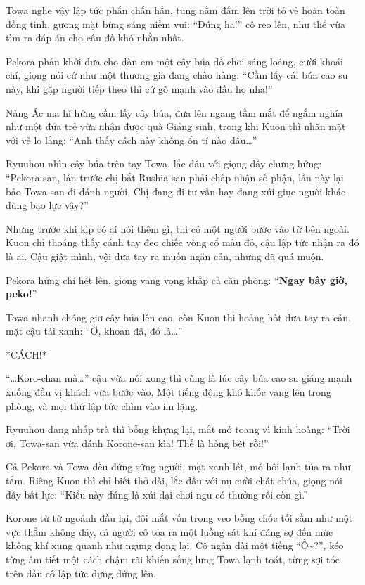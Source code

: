 \documentclass[../main.tex]{subfiles}
\begin{document}
Towa nghe vậy lập tức phấn chấn hẳn, tung nắm đấm lên trời tỏ vẻ hoàn toàn đồng tình, gương mặt bừng sáng niềm vui: ``Đúng ha!'' cô reo lên, như thể vừa tìm ra đáp án cho câu đố khó nhằn nhất.

Pekora phấn khởi đưa cho đàn em một cây búa đồ chơi sáng loáng, cười khoái chí, giọng nói cứ như một thương gia đang chào hàng: ``Cầm lấy cái búa cao su này, khi gặp người tiếp theo thì cứ gõ mạnh vào đầu họ nha!''


Nàng Ác ma hí hửng cầm lấy cây búa, đưa lên ngang tầm mắt để ngắm nghía như một đứa trẻ vừa nhận được quà Giáng sinh, trong khi Kuon thì nhăn mặt với vẻ lo lắng: ``Anh thấy cách này không ổn tí nào đâu\dots''

Ryuuhou nhìn cây búa trên tay Towa, lắc đầu với giọng đầy chưng hửng: ``Pekora-san, lần trước chị bắt Rushia-san phải chấp nhận số phận, lần này lại bảo Towa-san đi đánh người. Chị đang đi tư vấn hay đang xúi giục người khác dùng bạo lực vậy?''

Nhưng trước khi kịp có ai nói thêm gì, thì có một người bước vào từ bên ngoài. Kuon chỉ thoáng thấy cánh tay đeo chiếc vòng cổ màu đỏ, cậu lập tức nhận ra đó là ai. Cậu giật mình, vội đưa tay ra muốn ngăn cản, nhưng đã quá muộn.

Pekora hứng chí hét lên, giọng vang vọng khắp cả căn phòng: ``\textbf{Ngay bây giờ, peko!}''

Towa nhanh chóng giơ cây búa lên cao, còn Kuon thì hoảng hốt đưa tay ra cản, mặt cậu tái xanh: ``Ơ, khoan đã, đó là\dots''

*CÁCH!*

``\dots Koro-chan mà\dots'' cậu vừa nói xong thì cũng là lúc cây búa cao su giáng mạnh xuống đầu vị khách vừa bước vào. Một tiếng động khô khốc vang lên trong phòng, và mọi thứ lập tức chìm vào im lặng.


Ryuuhou đang nhấp trà thì bỗng khựng lại, mắt mở toang vì kinh hoàng: ``Trời ơi, Towa-san vừa đánh Korone-san kìa! Thế là hỏng bét rồi!''

Cả Pekora và Towa đều đứng sững người, mặt xanh lét, mồ hôi lạnh túa ra như tắm. Riêng Kuon thì chỉ biết thở dài, lắc đầu với nụ cười chát chúa, giọng nói đầy bất lực: ``Kiểu này đúng là xúi dại chơi ngu có thưởng rồi còn gì.''

Korone từ từ ngoảnh đầu lại, đôi mắt vốn trong veo bỗng chốc tối sầm như một vực thẳm không đáy, cả người cô tỏa ra một luồng sát khí đáng sợ đến mức không khí xung quanh như ngưng đọng lại. Cô ngân dài một tiếng ``Ồ\~{}?'', kéo từng âm tiết một cách chậm rãi khiến sống lưng Towa lạnh toát, từng sợi tóc trên đầu cô lập tức dựng đứng lên.
\end{document}
